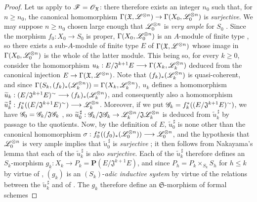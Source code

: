 \begin{proof}
Let us apply  to
$\mathscr{F}=\mathscr{O}_{\mathfrak{X}}$: there therefore exists an integer $n_0$ such
that, for $n\geq n_0$, the canonical homomorphism $\Gamma(\mathfrak{X},\mathscr{L}^{\otimes n})
\to
\Gamma(X_0,\mathscr{L}_0^{\otimes n})$
is \emph{surjective}.  We may suppose $n\geq n_0$ chosen large enough that
$\mathscr{L}_0^{\otimes n}$ is \emph{very ample} for $S_0$
.  Since the morphism
$f_0:X_0\to S_0$ is proper,
$\Gamma(X_0,\mathscr{L}_0^{\otimes n})$ is an $A$-module of finite type
, so there exists a sub-$A$-module of finite type $E$ of
$\Gamma(\mathfrak{X},\mathscr{L}^{\otimes n})$ whose image in
$\Gamma(X_0,\mathscr{L}_0^{\otimes n})$ is the whole of the latter module.
This being so, for every $k\geq0$, consider the homomorphism
$u_k:E/\mathfrak{J}^{k+1}E\longrightarrow
\Gamma(X_k,\mathscr{L}_k^{\otimes n})$
deduced from the canonical injection
$E\to\Gamma(\mathfrak{X},\mathscr{L}^{\otimes n})$.  Note that
$(f_k)_*(\mathscr{L}_k^{\otimes n})$ is quasi-coherent, and since
$\Gamma(S_k,(f_k)_*(\mathscr{L}_k^{\otimes n}))
=\Gamma(X_k,\mathscr{L}_k^{\otimes n})$, $u_k$ defines a homomorphism
$\widetilde{u}_k:(E/\mathfrak{J}^{k+1}E)^\sim
\longrightarrow(f_k)_*(\mathscr{L}_k^{\otimes n})$,
and consequently also a homomorphism
$\widetilde{u}_k^{\,\sharp}:
f_k^*((E/\mathfrak{J}^{k+1}E)^\sim)\longrightarrow
\mathscr{L}_k^{\otimes n}$.
Moreover, if we put
$\mathscr{G}_k=f_k^*((E/\mathfrak{J}^{k+1}E)^\sim)$, we have
$\mathscr{G}_0=\mathscr{G}_k/\mathfrak{J}\mathscr{G}_k$ , so
$\widetilde{u}_0^{\,\sharp}:\mathscr{G}_k/\mathfrak{J}\mathscr{G}_k
\to\mathscr{L}_k^{\otimes n}/\mathfrak{J}\mathscr{L}_k^{\otimes n}$ is deduced
from $\widetilde{u}_k^{\,\sharp}$ by passage to the quotients.  Now, by the
definition of $E$, $\widetilde{u}_0^{\,\sharp}$ is none other than the
canonical homomorphism
$\sigma:f_0^*((f_0)_*(\mathscr{L}_0^{\otimes n}))\longrightarrow
\mathscr{L}_0^{\otimes n}$,
and the hypothesis that $\mathscr{L}_0^{\otimes n}$ is very ample implies that
$\widetilde{u}_0^{\,\sharp}$ is \emph{surjective} ; it then
follows from Nakayama's lemma that each of the $\widetilde{u}_k^{\,\sharp}$ is
also \emph{surjective}.
Each of the $\widetilde{u}_k^{\,\sharp}$ therefore defines  an
$S_k$-morphism
$g_k:X_k\longrightarrow P_k=\mathbf{P}(E/\mathfrak{J}^{k+1}E)$,
and since $P_h=P_k\times_{S_k}S_h$ for $h\leq k$ by virtue of ,
$(g_k)$ is an $(S_k)$-\emph{adic inductive system}  by virtue of
the relations between the $\widetilde{u}_k^{\,\sharp}$ and of .
The $g_k$ therefore define an $\mathfrak{S}$-morphism of formal schemes

\end{proof}
